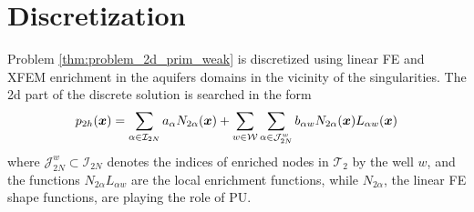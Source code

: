 % 


\section{Discretization}
\label{sec:prim_discretization}

Problem \ref{thm:problem_2d_prim_weak} is discretized using linear FE and XFEM enrichment
in the aquifers domains in the vicinity of the singularities.
The 2d part of the discrete solution is searched in the form
\begin{equation} \label{eqn:prim_xfem_standard_form}
  p_{2h}(\mathbf{\boldsymbol{x}}) = \sum_{\alpha\in\mathcal{I}_{2N}}a_\alpha N_{2\alpha}(\mathbf{\boldsymbol{x}})
    + \sum_{w\in\mathcal{W}} \sum_{\alpha\in\mathcal{J}^w_{2N}} b_{\alpha w} N_{2\alpha}(\mathbf{\boldsymbol{x}}) L_{\alpha w}(\mathbf{\boldsymbol{x}})
\end{equation}
where $\mathcal{J}^w_{2N}\subset\mathcal{I}_{2N}$ denotes the indices of enriched nodes in $\mathcal{T}_2$ 
by the well $w$, and the functions $N_{2\alpha}L_{\alpha w}$ are the local enrichment functions,
while $N_{2\alpha}$, the linear FE shape functions, are playing the role of PU.

